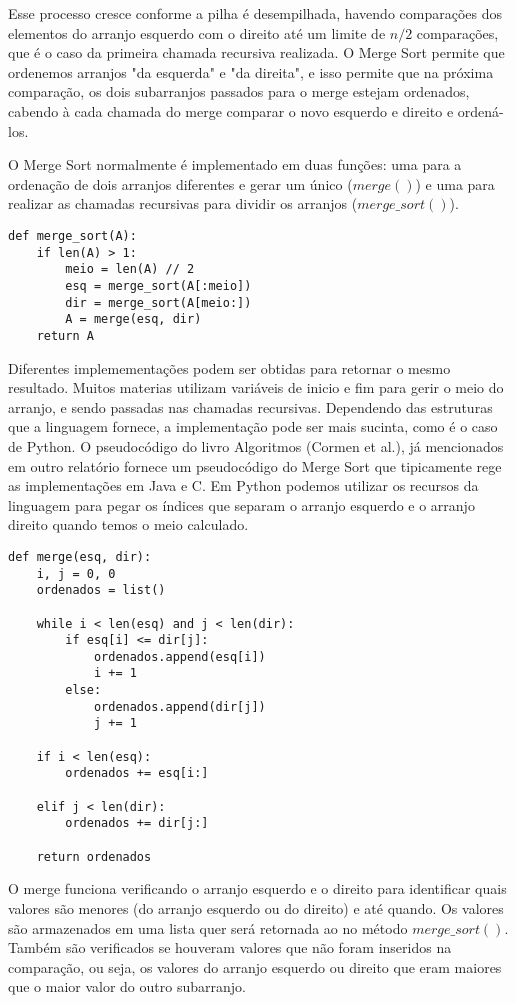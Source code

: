 \documentclass[a4paper, twocolumn]{article}
\theoremstyle{definition}
\begin{document}
Esse processo cresce conforme a pilha é desempilhada, havendo comparações dos elementos do arranjo esquerdo com o direito até um limite de $n/2$ comparações, que é o caso da primeira chamada recursiva realizada. O Merge Sort permite que ordenemos arranjos "da esquerda" e "da direita", e isso permite que na próxima comparação, os dois subarranjos passados para o merge estejam ordenados, cabendo à cada chamada do merge comparar o novo esquerdo e direito e ordená-los. 

O Merge Sort normalmente é implementado em duas funções: uma para a ordenação de dois arranjos diferentes e gerar um único ($merge()$) e uma para realizar as chamadas recursivas para dividir os arranjos ($merge\_sort()$).

\begin{lstlisting}[label=merge_sort,caption= Merge sort]
def merge_sort(A):
    if len(A) > 1:
        meio = len(A) // 2
        esq = merge_sort(A[:meio])
        dir = merge_sort(A[meio:])
        A = merge(esq, dir)
    return A
\end{lstlisting}

Diferentes implemementações podem ser obtidas para retornar o mesmo resultado. Muitos materias utilizam variáveis de inicio e fim para gerir o meio do arranjo, e sendo passadas nas chamadas recursivas. Dependendo das estruturas que a linguagem fornece, a implementação pode ser mais sucinta, como é o caso de Python. O pseudocódigo do livro Algoritmos (Cormen et al.), já mencionados em outro relatório fornece um pseudocódigo do Merge Sort que tipicamente rege as implementações em Java e C. Em Python podemos utilizar os recursos da linguagem para pegar os índices que separam o arranjo esquerdo e o arranjo direito quando temos o meio calculado.

\begin{lstlisting}[label=merge,caption= Merge]
def merge(esq, dir):
    i, j = 0, 0
    ordenados = list()

    while i < len(esq) and j < len(dir):
        if esq[i] <= dir[j]:
            ordenados.append(esq[i])
            i += 1
        else:
            ordenados.append(dir[j])
            j += 1
    
    if i < len(esq):
        ordenados += esq[i:]
    
    elif j < len(dir):
        ordenados += dir[j:]
    
    return ordenados
\end{lstlisting}

O merge funciona verificando o arranjo esquerdo e o direito para identificar quais valores são menores (do arranjo esquerdo ou do direito) e até quando. Os valores são armazenados em uma lista quer será retornada ao no método $merge\_sort()$. Também são verificados se houveram valores que não foram inseridos na comparação, ou seja, os valores do arranjo esquerdo ou direito que eram maiores que o maior valor do outro subarranjo.
    
\end{document}
